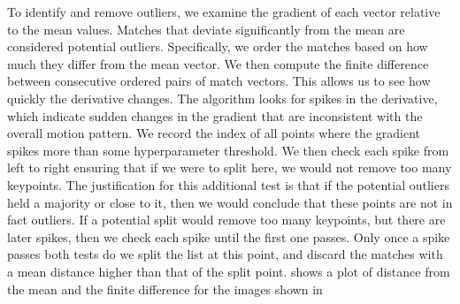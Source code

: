 To identify and remove outliers, we examine the gradient of each vector relative to the mean values. Matches that deviate significantly from the mean are considered potential outliers. Specifically, we order the matches based on how much they differ from the mean vector. We then compute the finite difference between consecutive ordered pairs of match vectors. This allows us to see how quickly the derivative changes. The algorithm looks for spikes in the derivative, which indicate sudden changes in the gradient that are inconsistent with the overall motion pattern. We record the index of all points where the gradient spikes more than some hyperparameter threshold. We then check each spike from left to right ensuring that if we were to split here, we would not remove too many keypoints. The justification for this additional test is that if the potential outliers held a majority or close to it, then we would conclude that these points are not in fact outliers. If a potential split would remove too many keypoints, but there are later spikes, then we check each spike until the first one passes. Only once a spike passes both tests do we split the list at this point, and discard the matches with a mean distance higher than that of the split point.  shows a plot of distance from the mean and the finite difference for the images shown in 

